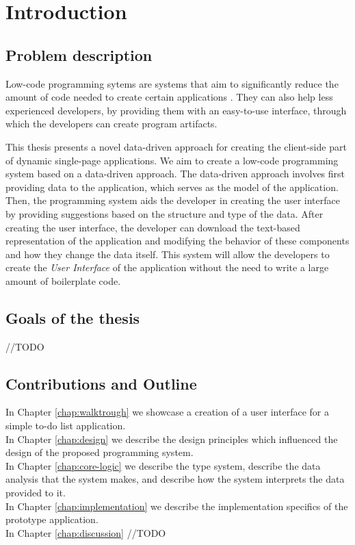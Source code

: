 \chapter*{Introduction}

\section*{Problem description}
Low-code programming sytems are systems that aim to significantly reduce the amount of code needed to create certain applications \cite{Pinho_Aguiar_Amaral_2023}.
They can also help less experienced developers, by providing them with an easy-to-use interface, through which the developers can create program artifacts.

This thesis presents a novel data-driven approach for creating the client-side part of dynamic single-page applications.
We aim to create a low-code programming system based on a data-driven approach.
The data-driven approach involves first providing data to the application, which serves as the model of the application.
Then, the programming system aids the developer in creating the user interface by providing suggestions based on the structure and type of the data.
After creating the user interface, the developer can download the text-based representation of the application and modifying the behavior of these components and how they change the data itself.
This system will allow the developers to create the \emph{User Interface} of the application without the need to write a large amount of boilerplate code.

\section*{Goals of the thesis}
//TODO

\section* {Contributions and Outline}

In Chapter \ref{chap:walktrough} we showcase a creation of a user interface for a simple to-do list application.\\
In Chapter \ref{chap:design} we describe the design principles which influenced the design of the proposed programming system.\\
In Chapter \ref{chap:core-logic} we describe the type system, describe the data analysis that the system makes, and describe how the system interprets the data provided to it.\\
In Chapter \ref{chap:implementation} we describe the implementation specifics of the prototype application.\\
In Chapter \ref{chap:discussion} //TODO \\
